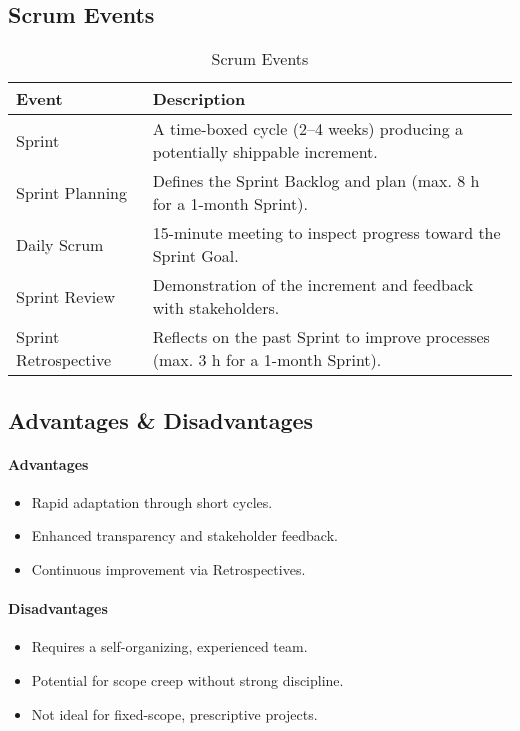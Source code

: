 \subsection{Scrum Events}

\begin{table}[H]
\centering
\begin{tabular}{|p{}|p{}|}
\hline
\textbf{Event} & \textbf{Description} \\
\hline
Sprint & A time-boxed cycle (2–4 weeks) producing a potentially shippable increment. \\
\hline
Sprint Planning & Defines the Sprint Backlog and plan (max. 8 h for a 1-month Sprint). \\
\hline
Daily Scrum & 15-minute meeting to inspect progress toward the Sprint Goal. \\
\hline
Sprint Review & Demonstration of the increment and feedback with stakeholders. \\
\hline
Sprint Retrospective & Reflects on the past Sprint to improve processes (max. 3 h for a 1-month Sprint). \\
\hline
\end{tabular}
\caption{Scrum Events}
\label{tab:scrum-events}
\end{table}

\subsection{Advantages \& Disadvantages}

\paragraph{Advantages}
\begin{itemize}
  \item Rapid adaptation through short cycles.
  \item Enhanced transparency and stakeholder feedback.
  \item Continuous improvement via Retrospectives.
\end{itemize}

\paragraph{Disadvantages}
\begin{itemize}
  \item Requires a self-organizing, experienced team.
  \item Potential for scope creep without strong discipline.
  \item Not ideal for fixed-scope, prescriptive projects.
\end{itemize}

